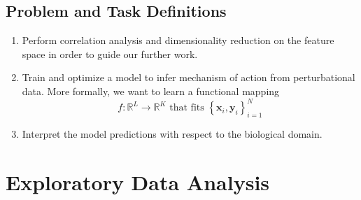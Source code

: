 \documentclass[bsc,frontabs,twoside,singlespacing,parskip,deptreport]{infthesis}     %
\let\Oldsection\section
\renewcommand{\section}{\FloatBarrier\Oldsection}
\begin{document}
\section{Problem and Task Definitions}
\begin{enumerate}
    \item Perform correlation analysis and dimensionality reduction on the feature space in order to guide our further work.
    \item Train and optimize a model to infer mechanism of action from perturbational data. More formally, we want to learn a functional mapping 
    \begin{equation} \label{funcmap}
    f: \mathbb{R}^{L} \rightarrow \mathbb{R}^{K} \text { that fits }\left\{\mathbf{x}_{i}, \mathbf{y}_{i}\right\}_{i=1}^{N}\end{equation}
    \item Interpret the model predictions with respect to the biological domain.
\end{enumerate}



\chapter{Exploratory Data Analysis}

\end{document}
